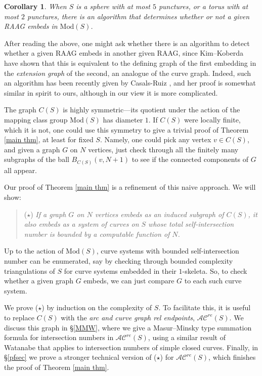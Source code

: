 \documentclass[11pt]{amsart}
\newtheorem{corollary}[theorem]{Corollary}
\theoremstyle{remark}
\numberwithin{equation}{section}
\newcommand{\Mod}{\mathrm{Mod}}
\newcommand{\cAC}{\mathcal{AC}}
\newcommand{\acre}{\cAC^{re}}
\begin{document}
\begin {corollary}
When $S$ is a sphere with at most $5$ punctures, or a torus with at most $2$ punctures, there is an algorithm that determines whether or not a given RAAG embeds in $\Mod(S)$.

\end {corollary}

After reading the above, one might ask whether there is an algorithm to detect whether a given RAAG embeds in another given RAAG, since Kim--Koberda \cite{kim2014geometry} have shown that this is equivalent to the defining graph of the first embedding in the \emph{extension graph}  of the second, an analogue of the curve graph. Indeed, such an algorithm has been recently given by Casals-Ruiz \cite{casals2015embeddability}, and her proof is somewhat similar in spirit to ours, although in our view it is more complicated.


The graph $C(S)$ is highly symmetric---its  quotient under the action of  the mapping class group $\Mod(S)$ has diameter $1$. If $C(S)$ were locally finite, which it is not, one could use this symmetry to give a trivial proof of Theorem \ref{main thm}, at least for fixed $S$. Namely, one could pick any vertex $v \in C(S)$, and given a graph $G$ on $N$  vertices, just check through all the finitely many subgraphs of the ball $B_{C(S)}(v,N+1)$ to see if the connected components of $G$ all appear.

Our proof of Theorem \ref{main thm} is a refinement of this naive approach. We will show:

\begin{quote}
	($\star$) \it If a graph $G$ on $N$  vertices embeds as an  induced subgraph of $C(S)$, it also embeds as a  system of curves on $S$ whose total self-intersection number is bounded by a computable function of $N$.\rm
\end{quote}
Up to the action of $\Mod(S)$, curve systems with  bounded self-intersection number can be enumerated, say by checking through bounded complexity triangulations of $S$ for curve systems embedded in their $1$-skeleta. So, to check whether a given graph $G$ embeds, we can just  compare $G$ to each such curve system. 

 We prove ($\star$) by induction on the complexity of $S$.  To facilitate this, it is useful to replace $C(S)$  with the \emph{arc and curve graph rel endpoints}, $\acre(S)$. We discuss this graph in \S \ref{MMW},  where we give a Masur--Minsky type summation formula for intersection numbers in $\acre(S)$, using a similar result of Watanabe \cite{Watanabe} that applies to intersection numbers of simple closed curves. Finally, in \S \ref{pfsec}  we prove a stronger technical version of ($\star$) for $\acre(S)$, which finishes the proof of Theorem \ref{main thm}.
\end{document}
